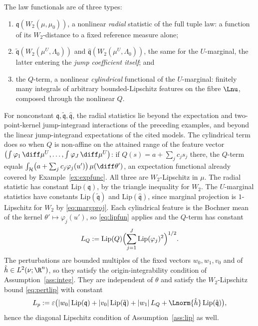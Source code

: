 \begin{example}
The law functionals are of three types:
\begin{enumerate}[label=(\roman*)]
\item $\mathfrak q(W_2(\mu,\mu_0))$, a nonlinear \emph{radial} statistic of the full tuple law:
  a function of its $W_2$-distance to a fixed reference measure alone;
\item $\tilde{\mathfrak q}(W_2(\mu^U,\Lambda_0))$ and $\hat{\mathfrak q}(W_2(\mu^U,\Lambda_0))$, the same for the
  $U$-marginal, the latter entering the \emph{jump coefficient itself}; and
\item the $Q$-term, a nonlinear \emph{cylindrical} functional of the $U$-marginal: finitely
  many integrals of arbitrary bounded-Lipschitz features on the fibre
  $\Lnu$, composed through the nonlinear $Q$.
\end{enumerate}
For nonconstant $\mathfrak q,\tilde{\mathfrak q},\hat{\mathfrak q}$, the radial statistics
lie beyond the expectation and two-point-kernel jump-integrand interactions of the preceding
examples, and beyond the linear jump-integrand expectations of the cited models. The
cylindrical term does so when $Q$ is non-affine on the attained range of the feature vector
$\bigl(\int\varphi_1\,\diff\mu^U,\dots,\int\varphi_J\,\diff\mu^U\bigr)$: if
$Q(s)=a+\sum_jc_js_j$ there, the $Q$-term equals
$\int_{\mathcal H}\bigl(a+\sum_jc_j\varphi_j(u')\bigr)\,\mu(\diff\theta')$, an expectation
functional already covered by Example~\ref{ex:expfunc}. All three are $W_2$-Lipschitz in $\mu$. The radial statistic has constant $\mathrm{Lip}(\mathfrak q)$, by the
triangle inequality for $W_2$. The $U$-marginal statistics have constants
$\mathrm{Lip}(\tilde{\mathfrak q})$ and $\mathrm{Lip}(\hat{\mathfrak q})$, since marginal projection is
$1$-Lipschitz for $W_2$ by \eqref{eq:margproj}. Each cylindrical feature is the Bochner mean of
the kernel $\theta'\mapsto\varphi_j(u')$, so \eqref{eq:lipfun} applies and the $Q$-term has
constant
\[
L_Q:=\mathrm{Lip}(Q)\Bigl(\sum_{j=1}^J\mathrm{Lip}(\varphi_j)^2\Bigr)^{1/2} .
\]
The perturbations are bounded multiples of the fixed vectors $w_0,w_1,v_0$ and of
$\hat h\in L^2(\nu;\R^n)$, so they satisfy the origin-integrability condition of
Assumption~\ref{ass:integ}.
They are independent of $\theta$ and satisfy the $W_2$-Lipschitz bound \eqref{eq:pertlip}
with constant
\[
L_p:=\varepsilon\bigl(|w_0|\,\mathrm{Lip}(\mathfrak q)+|v_0|\,\mathrm{Lip}(\tilde{\mathfrak q})+|w_1|\,L_Q
+\Lnorm{\hat h}\,\mathrm{Lip}(\hat{\mathfrak q})\bigr) ,
\]
hence the diagonal Lipschitz condition of Assumption~\ref{ass:lip} as well.


\end{example}

